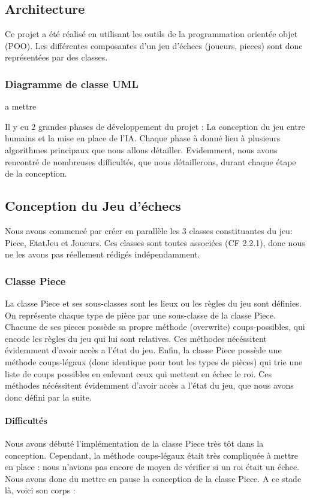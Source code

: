 \documentclass{article}
\begin{document}
\subsection{Architecture}
Ce projet a été réalisé en utilisant les outils de la programmation orientée objet (POO).
Les différentes composantes d'un jeu d'échecs (joueurs, pieces) sont donc 
représentées par des classes.
\subsubsection{Diagramme de classe UML}
a mettre


Il y eu 2 grandes phases de développement du projet : La conception du jeu entre humains
et la mise en place de l'IA. Chaque phase à donné lieu à plusieurs algorithmes principaux que nous allons détailler.
Evidemment, nous avons rencontré de nombreuses difficultés, que nous détaillerons, durant chaque étape de la conception.

\subsection{Conception du Jeu d'échecs}
Nous avons commencé par créer en parallèle les 3 classes constituantes du jeu:
Piece, EtatJeu et Joueurs. Ces classes sont toutes associées (CF 2.2.1), donc
nous ne les avons pas réellement rédigés indépendamment.
\subsubsection{Classe Piece}
La classe Piece et ses sous-classes sont les lieux ou les règles du jeu sont définies.
On représente chaque type de pièce par une sous-classe de la classe Piece.
Chacune de ses pieces possède sa propre méthode (overwrite) coups-possibles, qui encode les règles du jeu
qui lui sont relatives. Ces méthodes nécéssitent évidemment d'avoir accès a l'état du jeu.
Enfin, la classe Piece possède une méthode coups-légaux (donc identique pour tout les types de pièces)
qui trie une liste de coups possibles en enlevant ceux qui mettent en échec le roi.
Ces méthodes nécéssitent évidemment d'avoir accès a l'état du jeu, que nous avons donc défini par la suite.
\paragraph{Difficultés}
Nous avons débuté  l'implémentation de la classe Piece très tôt dans la conception. Cependant, la méthode 
coups-légaux était très compliquée à mettre en place : nous n'avions pas encore
de moyen de vérifier si un roi était un échec. Nous avons donc du mettre en pause
la conception de la classe Piece. A ce stade là, voici son corps : 
\end{document}
